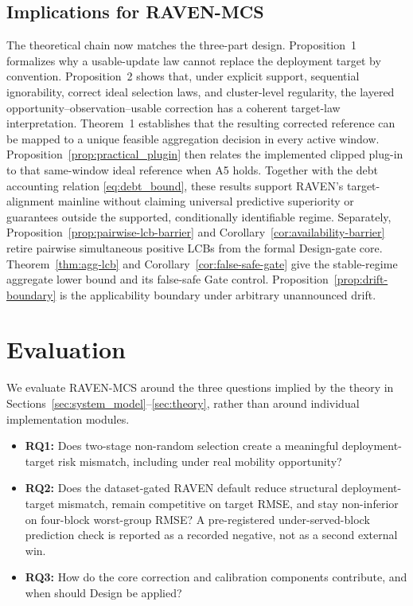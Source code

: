 \documentclass[letterpaper,journal]{IEEEtran}
\begin{document}
\subsection{Implications for RAVEN-MCS}
\label{subsec:theory_implications}

The theoretical chain now matches the three-part design.  Proposition~1
formalizes why a usable-update law cannot replace the deployment target by
convention.  Proposition~2 shows that, under explicit support, sequential
ignorability, correct ideal selection laws, and cluster-level regularity, the
layered opportunity--observation--usable correction has a coherent target-law
interpretation.  Theorem~1 establishes that the resulting corrected reference
can be mapped to a unique feasible aggregation decision in every active window.
Proposition~\ref{prop:practical_plugin} then relates the implemented
clipped plug-in to that same-window ideal reference when A5 holds.
Together with the debt accounting relation
\eqref{eq:debt_bound}, these results support RAVEN's target-alignment mainline
without claiming universal predictive superiority or guarantees outside the
supported, conditionally identifiable regime.  Separately,
Proposition~\ref{prop:pairwise-lcb-barrier} and
Corollary~\ref{cor:availability-barrier} retire pairwise simultaneous positive
LCBs from the formal Design-gate core.
Theorem~\ref{thm:agg-lcb} and Corollary~\ref{cor:false-safe-gate} give the
stable-regime aggregate lower bound and its false-safe Gate control.
Proposition~\ref{prop:drift-boundary} is the applicability boundary under
arbitrary unannounced drift.




\section{Evaluation}
\label{sec:evaluation}

We evaluate RAVEN-MCS around the three questions implied by the theory in
Sections~\ref{sec:system_model}--\ref{sec:theory}, rather than around individual
implementation modules.

\begin{itemize}
    \item \textbf{RQ1:} Does two-stage non-random selection create a meaningful
    deployment-target risk mismatch, including under real mobility
    opportunity?
    \item \textbf{RQ2:} Does the dataset-gated RAVEN default reduce
    structural deployment-target mismatch, remain competitive on
    target RMSE, and stay non-inferior on four-block worst-group RMSE?
    A pre-registered under-served-block prediction check is reported
    as a recorded negative, not as a second external win.
    \item \textbf{RQ3:} How do the core correction and calibration components
    contribute, and when should Design be applied?
\end{itemize}
\end{document}
